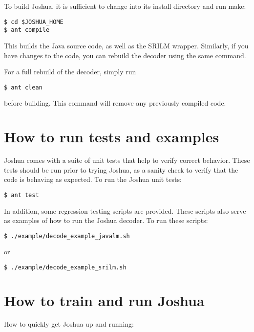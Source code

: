 To build Joshua, it is sufficient to change into its install directory
and run make:

\begin{verbatim}
$ cd $JOSHUA_HOME
$ ant compile
\end{verbatim}

This builds the Java source code, as well as the SRILM wrapper. Similarly, 
if you have changes to the code, you can rebuild the decoder using the same 
command.

For a full rebuild of the decoder, simply run

\begin{verbatim}
$ ant clean
\end{verbatim}

before building. This command will remove any previously compiled code.


\section{How to run tests and examples}

Joshua comes with a suite of unit tests that help to verify correct behavior. These tests should be run prior to trying Joshua, as a sanity check to verify that the code is behaving as expected. To run the Joshua unit tests:

\begin{verbatim}
$ ant test
\end{verbatim}


In addition, some regression testing scripts are provided. These scripts also serve as examples of how to run the Joshua decoder. To run these scripts:

\begin{verbatim}
$ ./example/decode_example_javalm.sh
\end{verbatim}

or

\begin{verbatim}
$ ./example/decode_example_srilm.sh
\end{verbatim}



\section{How to train and run Joshua}
\label{sec:train-joshua}

How to quickly get Joshua up and running:

